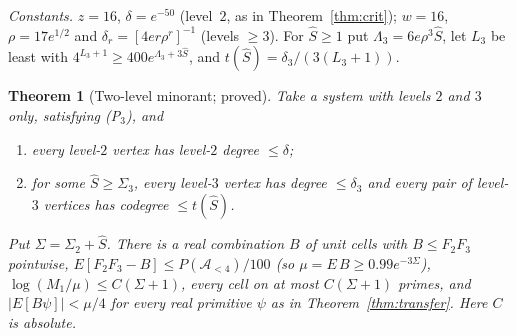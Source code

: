\documentclass[11pt,reqno]{amsart}
\newtheorem{theorem}{Theorem}[section]
\theoremstyle{definition}
\begin{document}
\emph{Constants.}  $z=16$, $\delta=e^{-50}$ (level~$2$, as in
Theorem~\ref{thm:crit}); $w=16$, $\rho=17e^{1/2}$ and
$\delta_r=[4er\rho^r]^{-1}$ (levels $\ge3$).  For $\hat S\ge1$ put
$\Lambda_3=6e\rho^3\hat S$, let $L_3$ be least with
$4^{L_3+1}\ge400e^{\Lambda_3+3\hat S}$, and $t(\hat S)=\delta_3/(3(L_3+1))$.

\begin{theorem}[Two-level minorant; proved]\label{thm:twolevel}
Take a system with levels $2$ and $3$ only, satisfying \textup{(P$_3$)}, and
\begin{enumerate}
\item[(D2)] every level-$2$ vertex has level-$2$ degree $\le\delta$;
\item[(D3)] for some $\hat S\ge\Sigma_3$, every level-$3$ vertex has degree
$\le\delta_3$ and every pair of level-$3$ vertices has codegree
$\le t(\hat S)$.
\end{enumerate}
Put $\Sigma=\Sigma_2+\hat S$.  There is a real combination $B$ of unit cells
with $B\le F_2F_3$ pointwise, $E[F_2F_3-B]\le P(\mathcal A_{<4})/100$ (so
$\mu=E\,B\ge0.99e^{-3\Sigma}$), $\log(M_1/\mu)\le C(\Sigma+1)$, every cell on at most
$C(\Sigma+1)$ primes, and $|E[B\psi]|<\mu/4$ for every real primitive $\psi$ as
in Theorem~\ref{thm:transfer}.  Here $C$ is absolute.
\end{theorem}
\end{document}
